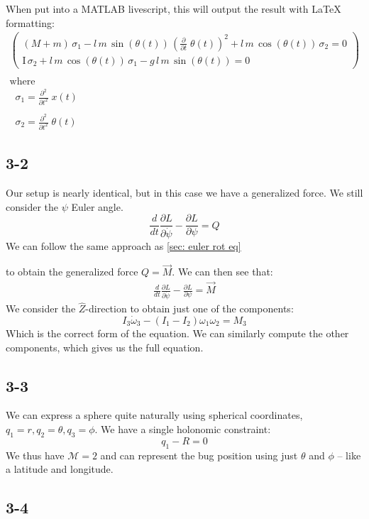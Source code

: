 \documentclass[10pt, openany, titlepage]{book}
\theoremstyle{definition}
\let\oldautoref\autoref
\renewcommand{\autoref}[1]{%
  \begingroup
  \hypersetup{linkcolor=black}%
  \oldautoref{#1}%
  \endgroup
}
\begin{document}
When put into a MATLAB livescript, this will output the result with LaTeX formatting:
$$\begin{array}{l}
\left(\begin{array}{c}
{\left(M+m\right)}\,\sigma_1 -l\,m\,\sin \left(\theta \left(t\right)\right)\,{{\left(\frac{\partial }{\partial t}\;\theta \left(t\right)\right)}}^2 +l\,m\,\cos \left(\theta \left(t\right)\right)\,\sigma_2 =0\\
\textrm{I}\,\sigma_2 +l\,m\,\cos \left(\theta \left(t\right)\right)\,\sigma_1 -g\,l\,m\,\sin \left(\theta \left(t\right)\right)=0
\end{array}\right)\\
\mathrm{}\\
\textrm{where}\\
\;\;\sigma_1 =\frac{\partial^2 }{\partial t^2 }\;x\left(t\right)\\
\mathrm{}\\
\;\;\sigma_2 =\frac{\partial^2 }{\partial t^2 }\;\theta \left(t\right)
\end{array}$$

\subsection*{3-2}
Our setup is nearly identical, but in this case we have a generalized force. We still consider the $\psi$ Euler angle.
$$\frac{d}{dt}\frac{\partial L}{\partial \dot{\psi}}-\frac{\partial L}{\partial \psi}=Q$$
We can follow the same approach as \autoref{sec: euler rot eq}
 to obtain the generalized force $Q=\vec{M}$. We can then see that:
 \begin{gather}
\frac{d}{dt}\frac{\partial L}{\partial \dot{\psi}}-\frac{\partial L}{\partial \psi}=\vec{M}
\end{gather}
We consider the $\hat{Z}$-direction to obtain just one of the components:
$$I_3\dot{\omega}_3-(I_1-I_2)\omega_1\omega_2=M_3
$$
Which is the correct form of the equation. We can similarly compute the other components, which gives us the full equation.
\subsection*{3-3}
We can express a sphere quite naturally using spherical coordinates, $q_1=r,q_2=\theta,q_3=\phi$. We have a single holonomic constraint:
$$q_1-R=0$$
We thus have $\mathcal{M}=2$ and can represent the bug position using just $\theta$ and $\phi$ -- like a latitude and longitude.
\subsection*{3-4}
\end{document}
